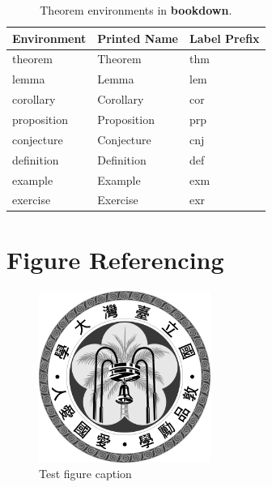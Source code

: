 \documentclass[oneside]{book}
\newenvironment{Shaded}{\begin{snugshade}}{\end{snugshade}}
\newcommand{\AlertTok}[1]{\textcolor[rgb]{0.94,0.16,0.16}{#1}}
\newcommand{\NormalTok}[1]{#1}
\begin{document}
\begin{table}[t]

\caption{\label{tab:theorem-envs}Theorem environments in \textbf{bookdown}.}
\centering
\begin{tabular}{lll}
\toprule
Environment & Printed Name & Label Prefix\\
\midrule
theorem & Theorem & thm\\
lemma & Lemma & lem\\
corollary & Corollary & cor\\
proposition & Proposition & prp\\
conjecture & Conjecture & cnj\\
\addlinespace
definition & Definition & def\\
example & Example & exm\\
exercise & Exercise & exr\\
\bottomrule
\end{tabular}
\end{table}

\hypertarget{figure-referencing}{%
\section{Figure Referencing}\label{figure-referencing}}

\begin{Shaded}
\end{Shaded}

\begin{figure}
\hypertarget{fig-with-pandoc}{%
\centering
\includegraphics[width=0.5\textwidth,height=\textheight]{img/watermark.png}
\caption{Test figure caption}\label{fig-with-pandoc}
}
\end{figure}
\end{document}
